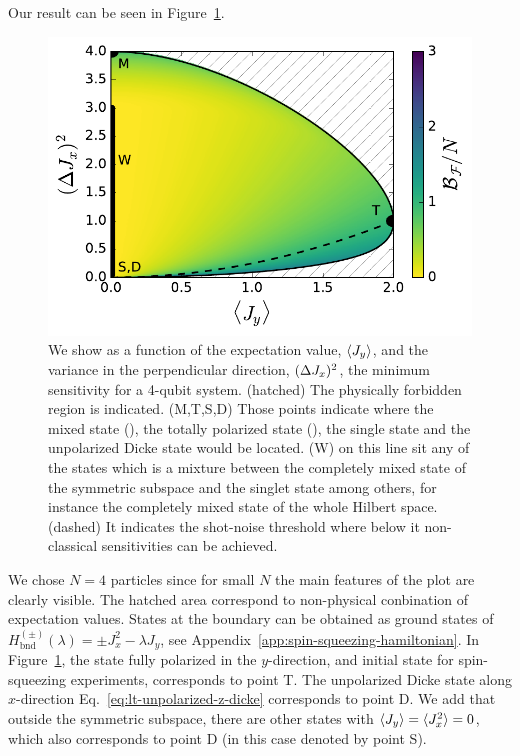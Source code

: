Our result can be seen in Figure~\ref{fig:lt-spsq2d-4}.
\begin{figure}
  \centering
  \includegraphics[scale=.65]{img/plots/LT_spsq2d_4.pdf}
  \caption{We show as a function of the expectation value, $\langle J_y \rangle$, and the variance in the perpendicular direction, $(\Delta J_x )^2$, the minimum sensitivity for a 4-qubit system.
  (hatched) The physically forbidden region is indicated. (M,T,S,D) Those points indicate where the mixed state (), the totally polarized state (), the single state and the unpolarized Dicke state would be located. (W) on this line sit any of the states which is a mixture between the completely mixed state of the symmetric subspace and the singlet state among others, for instance the completely mixed state of the whole Hilbert space. (dashed) It indicates the shot-noise threshold where below it non-classical sensitivities can be achieved.}
  \label{fig:lt-spsq2d-4}
\end{figure}
We chose $N=4$ particles since for small $N$ the main features of the plot are clearly visible.
The hatched area correspond to non-physical conbination of expectation values.
States at the boundary can be obtained as ground states of $H_{\text{bnd}}^{(\pm)}(\lambda)=\pm J_x^2 -\lambda J_y$, see Appendix~\ref{app:spin-squeezing-hamiltonian}.
In Figure~\ref{fig:lt-spsq2d-4}, the state fully polarized in the $y$-direction, and initial state for spin-squeezing experiments, corresponds to point T.
The unpolarized Dicke state along $x$-direction Eq.~\eqref{eq:lt-unpolarized-z-dicke} corresponds to point D.
We add that outside the symmetric subspace, there are other states with $\langle J_y \rangle=\langle J_x^2 \rangle=0$, which also corresponds to point D (in this case denoted by point S).
